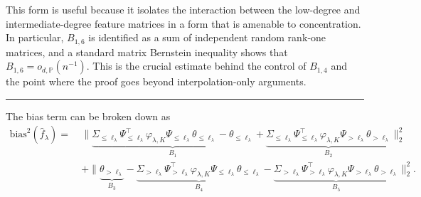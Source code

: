 \documentclass{article}
\theoremstyle{plain}
\theoremstyle{definition}
\theoremstyle{remark}
\begin{document}
\begin{appendix}
This form is useful because it isolates the interaction between the low-degree and intermediate-degree feature matrices in a form that is amenable to concentration. 
In particular, $B_{1, 6}$ is identified as a sum of independent random rank‑one matrices, and a standard matrix Bernstein inequality shows that $B_{1, 6}=o_{d,\mathbb{P}}(n^{-1})$.
This is the crucial estimate behind the control of $B_{1,4}$ and the point where the proof goes beyond interpolation-only arguments.

\iffalse
\color{red}
\hrule 
The bias term can be broken down as
\begin{equation*}
    \begin{aligned}
        \mathrm{bias}^2(\hat{f}_{\lambda})
        =&~
    \| \underbrace{\Sigma_{\leq \ell_{\lambda}} \Psi^{\top}_{\leq \ell_{\lambda}} \varphi_{\lambda, K} \Psi_{\leq \ell_{\lambda}} \theta_{\leq \ell_{\lambda}} - \theta_{\leq \ell_{\lambda}}  }_{B_{1}}+  \underbrace{\Sigma_{\leq \ell_{\lambda}} \Psi^{\top}_{\leq \ell_{\lambda}} \varphi_{\lambda, K} \Psi_{>\ell_{\lambda}} \theta_{>\ell_{\lambda}}}_{B_{2}} \|_{2}^{2}\\
    &~+
     \|\underbrace{\theta_{>\ell_{\lambda}}}_{B_{3}} - \underbrace{ \Sigma_{>\ell_{\lambda}} \Psi^{\top}_{>\ell_{\lambda}} \varphi_{\lambda, K} \Psi_{\leq \ell_{\lambda}} \theta_{\leq \ell_{\lambda}} }_{B_{4}} - \underbrace{  \Sigma_{>\ell_{\lambda}} \Psi^{\top}_{>\ell_{\lambda}} \varphi_{\lambda, K} \Psi_{>\ell_{\lambda}} \theta_{>\ell_{\lambda}} }_{ B_{5}}\|_{2}^{2}.
    \end{aligned}
\end{equation*}






\end{appendix}
\end{document}
